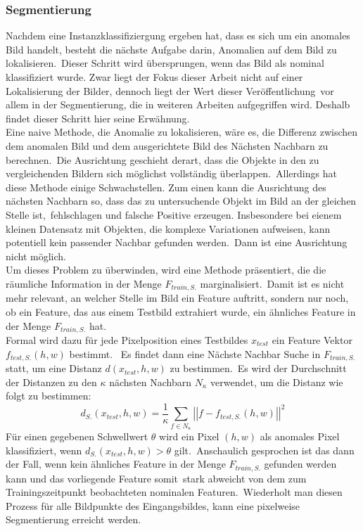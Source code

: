 \subsubsection{Segmentierung}
Nachdem eine Instanzklassifiziergung ergeben hat, dass es sich um ein anomales Bild handelt, besteht die nächste Aufgabe darin, Anomalien auf dem Bild zu lokalisieren.\
Dieser Schritt wird übersprungen, wenn das Bild als nominal klassifiziert wurde. Zwar liegt der Fokus dieser Arbeit nicht auf einer Lokalisierung der Bilder, dennoch liegt der Wert dieser Veröffentlichung\
vor allem in der Segmentierung, die in weiteren Arbeiten aufgegriffen wird. Deshalb findet dieser Schritt hier seine Erwähnung.\\
Eine naive Methode, die Anomalie zu lokalisieren, wäre es, die Differenz zwischen dem anomalen Bild und dem ausgerichtete Bild des Nächsten Nachbarn zu berechnen.\
Die Ausrichtung geschieht derart, dass die Objekte in den zu vergleichenden Bildern sich möglichst vollständig überlappen.\ 
Allerdings hat diese Methode einige Schwachstellen. Zum einen kann die Ausrichtung des nächsten Nachbarn so, dass das zu untersuchende Objekt im Bild an der gleichen Stelle ist,\
fehlschlagen und falsche Positive erzeugen. Insbesondere bei eienem kleinen Datensatz mit Objekten, die komplexe Variationen aufweisen, kann potentiell kein passender Nachbar gefunden werden.\
Dann ist eine Ausrichtung nicht möglich.\\
Um dieses Problem zu überwinden, wird eine Methode präsentiert, die die räumliche Information in der Menge $F_{train, S.}$ marginalisiert.\
Damit ist es nicht mehr relevant, an welcher Stelle im Bild ein Feature auftritt, sondern nur noch, ob ein Feature, das aus einem Testbild extrahiert wurde, ein ähnliches Feature in der Menge $F_{train, S.}$ hat.\\
Formal wird dazu für jede Pixelposition eines Testbildes $x_{test}$ ein Feature Vektor $f_{test, S.}(h,w)$ bestimmt.\
Es findet dann eine Nächste Nachbar Suche in $F_{train, S.}$ statt, um eine Distanz $d(x_{test},h,w)$ zu bestimmen.\
Es wird der Durchschnitt der Distanzen zu den $\kappa$ nächsten Nachbarn $N_{\kappa}$ verwendet, um die Distanz wie folgt zu bestimmen:\
$$
d_{S.}(x_{test},h,w) = \frac{1}{\kappa} \sum_{f\in N_{\kappa}} \left|\left| f - f_{test, S.}(h,w) \right|\right|^{2}
$$
Für einen gegebenen Schwellwert $\theta$ wird ein Pixel $(h,w)$ als anomales Pixel klassifiziert, wenn $d_{S.}(x_{test},h,w) > \theta$ gilt.\
Anschaulich gesprochen ist das dann der Fall, wenn kein ähnliches Feature in der Menge $F_{train, S.}$ gefunden werden kann und das vorliegende Feature somit\
stark abweicht von dem zum Trainingszeitpunkt beobachteten nominalen Featuren.\
Wiederholt man diesen Prozess für alle Bildpunkte des Eingangsbildes, kann eine pixelweise Segmentierung erreicht werden.\
